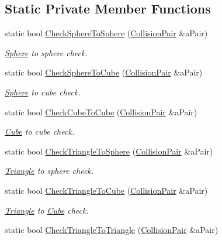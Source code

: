 \subsection*{Static Private Member Functions}
\begin{DoxyCompactItemize}
\item 
static bool \hyperlink{classCollisionChecker_acffb7d0c6289f3501963a0d0f916a12d}{Check\+Sphere\+To\+Sphere} (\hyperlink{structCollisionPair}{Collision\+Pair} \&a\+Pair)
\begin{DoxyCompactList}\small\item\em \hyperlink{structSphere}{Sphere} to sphere check. \end{DoxyCompactList}\item 
static bool \hyperlink{classCollisionChecker_af86ad91c8fc9577ec94b043f25f77926}{Check\+Sphere\+To\+Cube} (\hyperlink{structCollisionPair}{Collision\+Pair} \&a\+Pair)
\begin{DoxyCompactList}\small\item\em \hyperlink{structSphere}{Sphere} to cube check. \end{DoxyCompactList}\item 
static bool \hyperlink{classCollisionChecker_a3bf445fea8305994d48b952d71531d79}{Check\+Cube\+To\+Cube} (\hyperlink{structCollisionPair}{Collision\+Pair} \&a\+Pair)
\begin{DoxyCompactList}\small\item\em \hyperlink{structCube}{Cube} to cube check. \end{DoxyCompactList}\item 
static bool \hyperlink{classCollisionChecker_a4d215a94768abed49f79fc828c93d588}{Check\+Triangle\+To\+Sphere} (\hyperlink{structCollisionPair}{Collision\+Pair} \&a\+Pair)
\begin{DoxyCompactList}\small\item\em \hyperlink{structTriangle}{Triangle} to sphere check. \end{DoxyCompactList}\item 
static bool \hyperlink{classCollisionChecker_a671ef87dcaac1fdebfc375eab1bc9f37}{Check\+Triangle\+To\+Cube} (\hyperlink{structCollisionPair}{Collision\+Pair} \&a\+Pair)
\begin{DoxyCompactList}\small\item\em \hyperlink{structTriangle}{Triangle} to \hyperlink{structCube}{Cube} check. \end{DoxyCompactList}\item 
static bool \hyperlink{classCollisionChecker_a7b1b831b8ca78b3d84ae0431011af1d2}{Check\+Triangle\+To\+Triangle} (\hyperlink{structCollisionPair}{Collision\+Pair} \&a\+Pair)

\end{DoxyCompactItemize}
